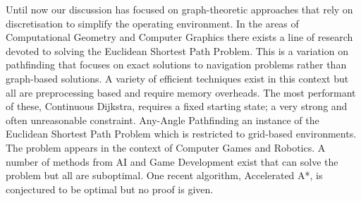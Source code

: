 Until now our discussion has focused on graph-theoretic approaches that rely on discretisation 
to simplify the operating environment. In the areas of Computational Geometry and Computer 
Graphics there exists a line of research devoted to solving the Euclidean Shortest Path
Problem. This is a variation on pathfinding that focuses on exact solutions to navigation 
problems rather than graph-based solutions. A variety of efficient techniques exist in this 
context but all are preprocessing based and require memory overheads. The most performant of 
these, Continuous Dijkstra, requires a fixed starting state; a very strong and often unreasonable 
constraint. 
Any-Angle Pathfinding an instance of the Euclidean Shortest Path Problem which is restricted
to grid-based environments. The problem appears in the context of Computer Games and Robotics.
A number of methods from AI and Game Development exist that can solve the problem but all
are suboptimal. One recent algorithm, Accelerated A*, is conjectured to be optimal but no
proof is given. 

